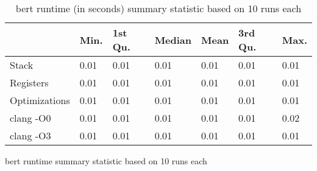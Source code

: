 \begin{table}[h!]
\centering
\begin{tabular}{p{}p{}p{}p{}p{}p{}p{}}
  \hline
 & Min. & 1st Qu. & Median & Mean & 3rd Qu. & Max. \\ 
  \hline
Stack & 0.01 & 0.01 & 0.01 & 0.01 & 0.01 & 0.01 \\ 
  Registers & 0.01 & 0.01 & 0.01 & 0.01 & 0.01 & 0.01 \\ 
  Optimizations & 0.01 & 0.01 & 0.01 & 0.01 & 0.01 & 0.01 \\ 
  clang -O0 & 0.01 & 0.01 & 0.01 & 0.01 & 0.01 & 0.02 \\ 
  clang -O3 & 0.01 & 0.01 & 0.01 & 0.01 & 0.01 & 0.01 \\ 
   \hline
\end{tabular}
\caption{bert runtime summary statistic based on 10 runs each}
\caption{bert runtime (in seconds) summary statistic based on 10 runs each}
\end{table}
